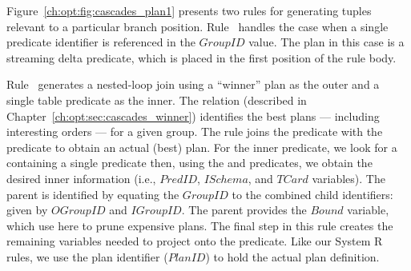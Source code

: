 Figure~\ref{ch:opt:fig:cascades_plan1} presents two rules for generating
 tuples relevant to a particular branch position.  Rule~
handles the case when a single predicate identifier is referenced in the
$GroupID$ value.  The plan in this case is a streaming delta predicate, which
is placed in the first position of the rule body.

Rule~ generates a nested-loop join  using a ``winner'' plan as
the outer and a single table predicate as the inner.  The  relation
(described in Chapter~\ref{ch:opt:sec:cascades_winner}) identifies the best
plans --- including interesting orders --- for a given group.  The rule joins
the  predicate with the  predicate to obtain an actual
(best) plan.  For the inner predicate, we look for a  containing a
single predicate then, using the  and 
predicates, we obtain the desired inner information (i.e., $PredID$, $ISchema$,
and $TCard$ variables).  The parent  is identified by equating the
$GroupID$ to the combined child identifiers: given by $OGroupID$ and
$IGroupID$.  The parent  provides the $Bound$ variable, which use
here to prune expensive plans.  The final step in this rule creates the
remaining variables needed to project onto the  predicate.  Like our
System R rules, we use the plan identifier ($PlanID$) to hold the actual plan
definition.


